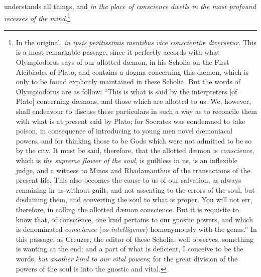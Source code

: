 \documentclass[12pt]{article}
\begin{document}
understands all things, and \textit{in the place of conscience dwells in the
most profound recesses of the mind}.\footnote{In the original, \textit{in ipsis
peritissimis mentibus vice conscienti{\ae} diversetur}. This is a most
remarkable passage, since it perfectly accords with what Olympiodorus says of
our allotted d{\ae}mon, in his Scholia on the First Alcibiades of
Plato, and contains a dogma concerning this d{\ae}mon, which is only to be
found explicitly maintained in these Scholia. But the words of
Olympiodorus are as follow: ``This is what is said by the interpreters [of
Plato] concerning d{\ae}mons, and those which are allotted to us. We, however,
shall endeavour to discuss these particulars in such a way as to reconcile them
with what is at present said by Plato; for Socrates was condemned to take
poison, in consequence of introducing to young men novel d{\ae}moniacal powers,
and for thinking those to be Gods which were not admitted to be so by the city.
It must be said, therefore, that the allotted d{\ae}mon is \textit{conscience},
which is \textit{the supreme flower of the soul}, is guiltless in us, is an
inflexible judge, and a witness to Minos and Rhadamanthus of the transactions
of the present life. This also becomes the cause to us of our salvation, as
always remaining in us without guilt, and not assenting to the errors of the
soul, but disdaining them, and converting the soul to what is proper. You will
not err, therefore, in calling the allotted d{\ae}mon conscience. But it is
requisite to know that, of conscience, one kind pertains to our gnostic powers,
and which is denominated \textit{conscience} (\textit{co-intelligence})
homonymously with the genus.'' In this passage, as Creuzer, the editor of these
Scholia, well observes, something is wanting at the end; and a part of
what is deficient, I conceive to be the words, \textit{but another kind to our
vital powers}; for the great division of the powers of the soul is into the
gnostic and vital.

}
\end{document}
